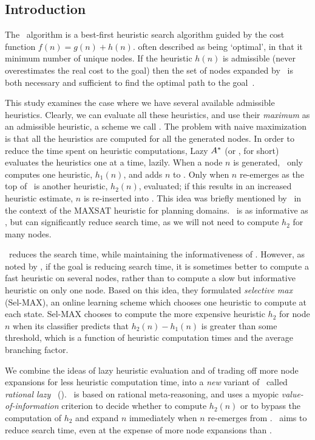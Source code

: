 \subsection{Introduction}


The \astar~algorithm \cite{ASTR68} is a best-first heuristic search
algorithm guided by the cost function $f(n)=g(n)+h(n)$. %
often described as being `optimal', in that it %
minimum number of unique nodes.  If the heuristic $h(n)$ is admissible (never
overestimates the real cost to the goal) then the set of nodes expanded
by \astar~is both necessary and sufficient to find the optimal path
to the goal~\cite{ASTR85}.

This study examines the case where we have several available admissible
heuristics. Clearly, we can evaluate all these heuristics, and use their {\em
maximum} as an admissible heuristic, a scheme we call \astarmax.
The problem with naive maximization is that all the heuristics are
computed for all the generated nodes.
In order to reduce the time spent on heuristic computations, Lazy $A^\ast$ (or
\lazyastar, for short) evaluates the heuristics one at a time, lazily. When a node $n$ is
generated, \lazyastar~only computes one heuristic, $h_1(n)$, and adds $n$ to
\OPEN.  Only when $n$ re-emerges as the top of \OPEN~is another heuristic, $h_2(n)$,
evaluated; if this results in an increased heuristic estimate, $n$ is
re-inserted into \OPEN.  This idea was briefly mentioned by~\cite{zhang-bacchus:aaai-2012} in the
context of the MAXSAT heuristic for planning domains.
\lazyastar~is as informative as \astarmax, but can significantly reduce
search time, as we will not need to compute $h_2$ for many nodes.

\lazyastar~reduces the search time, while maintaining the informativeness of \astarmax.
However, as noted by \cite{domshlak-et-al:jair-2012},  if the goal is reducing
search time, it is sometimes better to compute a fast heuristic on
several nodes, rather than to compute a slow but informative heuristic on only one
node.
Based on this idea, they formulated {\em selective max} (Sel-MAX), an online
learning scheme which chooses one heuristic to compute at each
state. Sel-MAX chooses to compute the more expensive heuristic $h_2$ for
node $n$ when its classifier predicts that $h_2(n) - h_1(n)$ is greater than
some threshold, which is a function of heuristic computation times and the average
branching factor.

We combine the ideas of lazy heuristic evaluation and of trading off more node expansions
for less heuristic computation time, into a {\em new} variant of \lazyastar~called
{\em rational lazy} \astar~(\rationallazyastar).
\rationallazyastar~is based on rational meta-reasoning, and uses a myopic {\em
value-of-information} criterion to decide whether to compute $h_2(n)$ or to
bypass the computation of $h_2$ and expand $n$ immediately when $n$ re-emerges
from \OPEN. \rationallazyastar~aims to reduce search time, even at the expense of
more node expansions than \astarmax.

